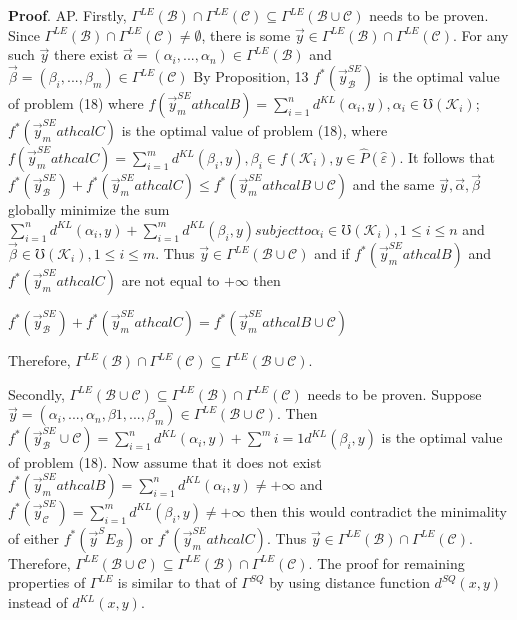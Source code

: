 \documentclass[]{iosart2c}
\begin{document}
\textbf{Proof}. AP. Firstly, $\Gamma^{LE}(\mathcal{B}) \cap \Gamma^{LE}(\mathcal{C}) \subseteq \Gamma^{LE}(\mathcal{B} \cup \mathcal{C})$
needs to be proven. Since $\Gamma^{LE}(\mathcal{B}) \cap \Gamma^{LE}(\mathcal{C}) \neq \emptyset$,
there is some $\vec{y} \in \Gamma^{LE}(\mathcal{B}) \cap \Gamma^{LE}(\mathcal{C})$. For any
such $\vec{y}$ there exist $\vec{\alpha} = (\alpha_i, ... , \alpha_n) \in \Gamma^{LE}(\mathcal{B})$
and $\vec{\beta} = (\beta_i, ... , \beta_m) \in \Gamma^{LE}(\mathcal{C})$ By Proposition,
13 $f^*(\vec{y}^{SE}_\mathcal{B} )$ is the optimal value of problem
(18) where $f (\vec{y}^{SE}_mathcal{B} ) = \sum^n_{i=1} d^{KL}(\alpha_i, y), \alpha_i \in \mho(\mathcal{K}_i)$;
$f^*(\vec{y}^{SE}_mathcal{C} )$ is the optimal value of problem (18),
where $f (\vec{y}^{SE}_mathcal{C} ) = \sum^m_{i=1} d^{KL}(\beta_i, y), \beta_i \in f(\mathcal{K}_i), y \in	
\widehat{P}(\hat{\varepsilon})$. It follows that $f^*(\vec{y}^{SE}_\mathcal{B} ) + f^*(\vec{y}^{SE}_mathcal{C} ) \leq f^*(\vec{y}^{SE}_mathcal{B}\cup\mathcal{C})$
and the same $\vec{y}, \vec{\alpha}, \vec{\beta}$ globally minimize the sum $\sum^n_{i=1} d^{KL}(\alpha_i, y) +\sum^m_{i=1} d^{KL}(\beta_i, y) subject to \alpha_i \in
\mho(\mathcal{K}_i), 1 \leq i \leq n$ and $\vec{\beta} \in \mho(\mathcal{K}_i), 1 \leq i \leq m$. Thus
$\vec{y} \in \Gamma^{LE}(\mathcal{B} \cup \mathcal{C})$ and if $f^*(\vec{y}^{SE}_mathcal{B} )$ and $f^*(\vec{y}^{SE}_mathcal{C} )$ are not
equal to $+\infty$ then 

$f^*(\vec{y}^{SE}_\mathcal{B} ) + f^*(\vec{y}^{SE}_mathcal{C} ) = f^*(\vec{y}^{SE}_mathcal{B}\cup\mathcal{C})$

Therefore, $\Gamma^{LE}(\mathcal{B}) \cap \Gamma^{LE}(\mathcal{C}) \subseteq \Gamma^{LE}(\mathcal{B} \cup \mathcal{C})$. 

Secondly, $\Gamma^{LE}(\mathcal{B} \cup \mathcal{C}) \subseteq \Gamma^{LE}(\mathcal{B}) \cap \Gamma^{LE}(\mathcal{C})$ needs
to be proven. Suppose $\vec{y} = (\alpha_i, ... , \alpha_n, \beta1, ... , \beta_m)
\in \Gamma^{LE}(\mathcal{B} \cup \mathcal{C})$.
Then $f^*(\vec{y}^{SE}_\mathcal{B} \cup\mathcal{C}) = \sum^n_{i=1} d^{KL}(\alpha_i, y) + \sum^m{i=1} d^{KL}(\beta_i, y)$ is the optimal value of problem (18).
Now assume that it does not exist $f^*(\vec{y}^{SE}_mathcal{B} ) = \sum^n_{i=1} d^{KL}(\alpha_i, y) \neq +\infty$ and $f^*(\vec{y}^{SE}_\mathcal{C} ) = \sum^m_{i=1}
d^{KL}(\beta_i, y) \neq +\infty$ then this would contradict
the minimality of either $f^*(\vec{y}^SE_\mathcal{B})$ or
$f^*(\vec{y}^{SE}_mathcal{C} )$. Thus $\vec{y} \in \Gamma^{LE}(\mathcal{B}) \cap \Gamma^{LE}(\mathcal{C})$. Therefore,
$\Gamma^{LE}(\mathcal{B} \cup \mathcal{C}) \subseteq \Gamma^{LE}(\mathcal{B}) \cap \Gamma^{LE}(\mathcal{C})$.
The proof for remaining properties of $\Gamma^{LE}$ is similar to that of
$\Gamma^{SQ}$ by using distance function $d^{SQ}(x, y)$
instead of $d^{KL}(x, y)$.
\end{document}
